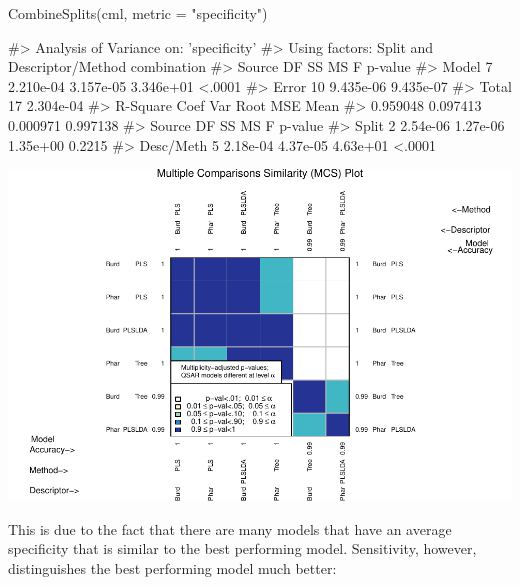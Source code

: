 \begin{Schunk}
\begin{Sinput}
CombineSplits(cml, metric = "specificity")
\end{Sinput}
\begin{Soutput}
#>    Analysis of Variance on: 'specificity'
#>  Using factors: Split and Descriptor/Method combination
#> Source    DF          SS          MS           F   p-value   
#> Model      7   2.210e-04   3.157e-05   3.346e+01    <.0001   
#> Error     10   9.435e-06   9.435e-07   
#> Total     17   2.304e-04   
#>       R-Square   Coef Var   Root MSE       Mean   
#>       0.959048   0.097413   0.000971   0.997138   
#> Source       DF         SS         MS          F   p-value   
#> Split         2   2.54e-06   1.27e-06   1.35e+00    0.2215   
#> Desc/Meth     5   2.18e-04   4.37e-05   4.63e+01    <.0001
\end{Soutput}

\includegraphics{chemmodlabRJournal_files/figure-latex/CombineSplits_sp-1} \end{Schunk}

This is due to the fact that there are many models that have an average
specificity that is similar to the best performing model. Sensitivity,
however, distinguishes the best performing model much better:

